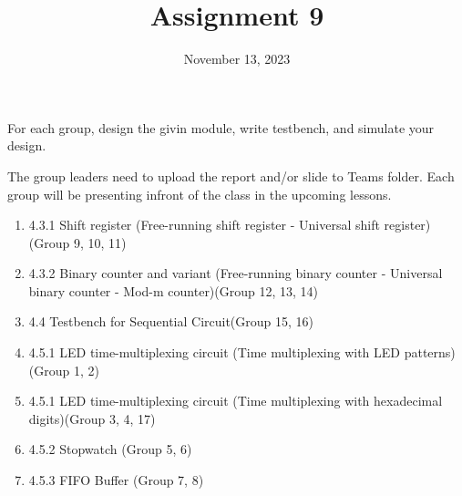 \documentclass{vhdl-assignment}
\title{Assignment 9}
\date{November 13, 2023}
\begin{document}
\maketitle
\thispagestyle{fancy}

For each group, design the givin module, write testbench, and simulate your design.

The group leaders need to upload the report and/or slide to Teams folder. Each group will be presenting infront of the class in the upcoming lessons.

\begin{enumerate}
    \item 4.3.1 Shift register (Free-running shift register - Universal shift register) (Group 9, 10, 11)
    \item 4.3.2 Binary counter and variant (Free-running binary counter - Universal binary counter - Mod-m counter)(Group 12, 13, 14)
    \item 4.4 Testbench for Sequential Circuit(Group 15, 16)
    \item 4.5.1 LED time-multiplexing circuit (Time multiplexing with LED patterns)(Group 1, 2)
    \item 4.5.1 LED time-multiplexing circuit (Time multiplexing with hexadecimal digits)(Group 3, 4, 17)
    \item 4.5.2 Stopwatch (Group 5, 6)
    \item 4.5.3 FIFO Buffer (Group 7, 8)
\end{enumerate}

\end{document}
